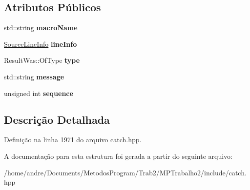 \subsection*{Atributos Públicos}
\begin{DoxyCompactItemize}
\item 
std\+::string {\bfseries macro\+Name}\hypertarget{structCatch_1_1MessageInfo_a156ade4b3cc731f6ec7b542ae47ba8e3}{}\label{structCatch_1_1MessageInfo_a156ade4b3cc731f6ec7b542ae47ba8e3}

\item 
\hyperlink{structCatch_1_1SourceLineInfo}{Source\+Line\+Info} {\bfseries line\+Info}\hypertarget{structCatch_1_1MessageInfo_a985165328723e599696ebd8e43195cc5}{}\label{structCatch_1_1MessageInfo_a985165328723e599696ebd8e43195cc5}

\item 
Result\+Was\+::\+Of\+Type {\bfseries type}\hypertarget{structCatch_1_1MessageInfo_ae928b9117465c696e45951d9d0284e78}{}\label{structCatch_1_1MessageInfo_ae928b9117465c696e45951d9d0284e78}

\item 
std\+::string {\bfseries message}\hypertarget{structCatch_1_1MessageInfo_ab6cd06e050bf426c6577502a5c50e256}{}\label{structCatch_1_1MessageInfo_ab6cd06e050bf426c6577502a5c50e256}

\item 
unsigned int {\bfseries sequence}\hypertarget{structCatch_1_1MessageInfo_a7f4f57ea21e50160adefce7b68a781d6}{}\label{structCatch_1_1MessageInfo_a7f4f57ea21e50160adefce7b68a781d6}

\end{DoxyCompactItemize}


\subsection{Descrição Detalhada}


Definição na linha 1971 do arquivo catch.\+hpp.



A documentação para esta estrutura foi gerada a partir do seguinte arquivo\+:\begin{DoxyCompactItemize}
\item 
/home/andre/\+Documents/\+Metodos\+Program/\+Trab2/\+M\+P\+Trabalho2/include/catch.\+hpp\end{DoxyCompactItemize}
